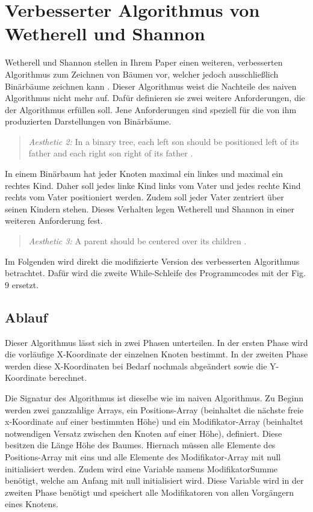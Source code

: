 \section{Verbesserter Algorithmus von Wetherell und Shannon}
\label{chap:kapitel3_2}
Wetherell und Shannon stellen in Ihrem Paper einen weiteren, verbesserten Algorithmus zum Zeichnen von Bäumen vor, welcher jedoch
ausschließlich Binärbäume zeichnen kann \cite{q1}. Dieser Algorithmus weist die Nachteile des naiven Algorithmus nicht mehr auf.
Dafür definieren sie zwei weitere Anforderungen, die der Algorithmus erfüllen soll. Jene Anforderungen sind speziell für
die von ihm produzierten Darstellungen von Binärbäume.   

\begin{quotation}
	\textit{Aesthetic 2:} In a binary tree, each left son should be positioned
	left of its father and each right son right of its father \cite[S. 517]{q1}.
\end{quotation}

In einem Binärbaum hat jeder Knoten maximal ein linkes und maximal ein rechtes Kind. Daher soll jedes linke Kind 
links vom Vater und jedes rechte Kind rechts vom Vater positioniert werden. Zudem soll jeder Vater zentriert über seinen Kindern
stehen. Dieses Verhalten legen Wetherell und Shannon in einer weiteren Anforderung fest.

\begin{quotation}
	\textit{Aesthetic 3:} A parent should be centered over its children \cite[S. 518]{q1}.
\end{quotation}

Im Folgenden wird direkt die modifizierte Version des verbesserten Algorithmus betrachtet. Dafür wird die zweite While-Schleife des Programmcodes
mit der Fig. 9 \cite[A modification of Algorithm 3, S. 519]{q1} ersetzt.

\label{chap:kapitel3_2_Ablauf}
\subsection{Ablauf}

Dieser Algorithmus lässt sich in zwei Phasen unterteilen. In der ersten Phase wird die vorläufige X-Koordinate der einzelnen Knoten bestimmt.
In der zweiten Phase werden diese X-Koordinaten bei Bedarf nochmals abgeändert sowie die Y-Koordinate berechnet.

Die Signatur des Algorithmus ist dieselbe wie im naiven Algorithmus. Zu Beginn werden zwei
ganzzahlige Arrays, ein Positions-Array (beinhaltet die nächste freie x-Koordinate auf einer bestimmten Höhe) und ein 
Modifikator-Array (beinhaltet notwendigen Versatz zwischen den Knoten auf einer Höhe), definiert. Diese besitzen die Länge 
\glqq Höhe des Baumes\grqq{}.
Hiernach müssen alle Elemente des Positions-Array mit eins und alle Elemente des Modifikator-Array mit null initialisiert werden.
Zudem wird eine Variable namens \glqq ModifikatorSumme\grqq{} benötigt, welche am Anfang mit null initialisiert wird. Diese Variable wird 
in der zweiten Phase benötigt und speichert alle Modifikatoren von allen Vorgängern eines Knotens.

